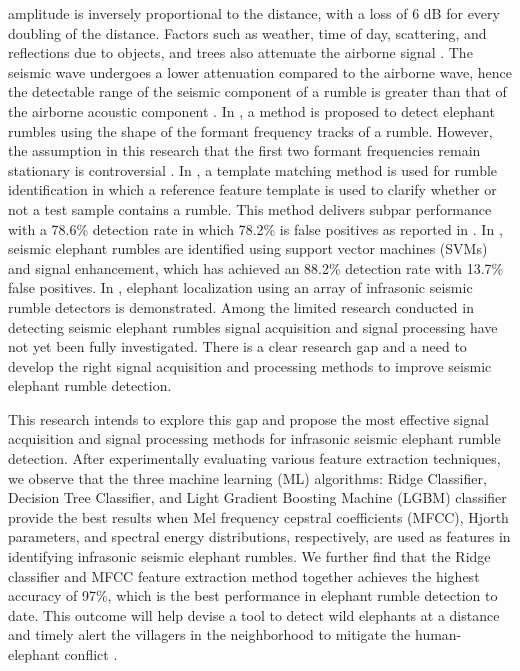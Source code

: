 \documentclass[applsci,article,accept,moreauthors,pdftex]{Definitions/mdpi}
\begin{document}
amplitude is inversely proportional to the distance, with a loss of 6 dB for every doubling of the distance. Factors such as weather, time of day, scattering, and reflections due to objects, and trees also attenuate the airborne signal \cite{o2000seismic}. The seismic wave undergoes a lower attenuation compared to the airborne wave, hence the detectable range of the seismic component of a rumble is greater than that of the airborne acoustic component \cite{sayakkara2017eloc}. In \cite{wijayakulasooriya}, a method is proposed to detect elephant rumbles using the shape of the formant frequency tracks of a rumble. However, the assumption in this research that the first two formant frequencies remain stationary is controversial \cite{zeppelzauer2015towards}. In \cite{Hao}, a template matching method is used for rumble identification in which a reference feature template is used to clarify whether or not a test sample contains a rumble. This method delivers subpar performance with a 78.6\% detection rate in which 78.2\% is false positives as reported in \cite{zeppelzauer2015}. In \cite{zeppelzauer2015}, seismic elephant rumbles are identified using support vector machines (SVMs) and signal enhancement, which has achieved an 88.2\% detection rate with 13.7\% false positives. In  \cite{Reinwald2021}, elephant localization using an array of infrasonic seismic rumble detectors is demonstrated. Among the limited research conducted in detecting seismic elephant rumbles signal acquisition and signal processing have not yet been fully investigated. There is a clear research gap and a need to develop the right signal acquisition and processing methods to improve seismic elephant rumble detection.

This research intends to explore this gap and propose the most effective signal acquisition and signal processing methods for infrasonic seismic elephant rumble detection. After experimentally evaluating various feature extraction techniques, we observe that the three machine learning (ML) algorithms: Ridge Classifier, Decision Tree Classifier, and Light Gradient Boosting Machine (LGBM) classifier provide the best results when Mel frequency cepstral coefficients (MFCC), Hjorth parameters, and spectral energy distributions, respectively, are used as features in identifying infrasonic seismic elephant rumbles. We further find that the Ridge classifier and MFCC feature extraction method together achieves the highest accuracy of 97\%, which is the best performance in elephant rumble detection to date. This outcome will help devise a tool to detect wild elephants at a distance and timely alert the villagers in the neighborhood to mitigate the human-elephant conflict \cite{prakash}.
\end{document}
